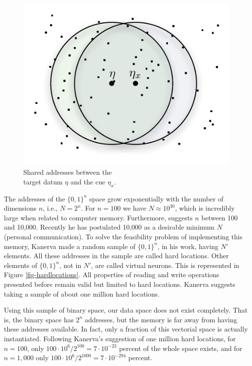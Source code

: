 \begin{figure}[!htb]
\centering\includegraphics[scale=0.75]{./images02/p1_inter_p2.pdf}

\caption{Shared addresses between the \protect \\
target datum $\eta$ and the cue $\eta_{x}$. \label{fig-shared-addresses}}
\end{figure}


The addresses of the $\{0,1\}^{n}$ space grow exponentially with the number of dimensions $n$, i.e., $N=2^{n}$. For $n=100$ we have $N\approx10^{30}$, which is incredibly large when related to computer memory. Furthermore, \citet{Kanerva1988} suggests $n$ between 100 and 10,000. Recently he has postulated 10,000 as a desirable minimum $N$ (personal communication). To solve the feasibility problem of implementing this memory, Kanerva made a random sample of $\{0,1\}^{n}$, in his work, having $N'$ elements. All these addresses in the sample are called hard locations. Other elements of $\{0,1\}^{n}$, not in $N'$, are called virtual neurons. This is represented in Figure \ref{fig-hardlocations}.  All properties of reading and write operations presented before remain valid but limited to hard locations. Kanerva suggests taking a sample of about one million hard locations.

Using this sample of binary space, our data space does not exist completely.  That is, the binary space has $2^{n}$ addresses, but the memory is far away from having these addresses available. In fact, only a fraction of this vectorial space is actually instantiated. Following Kanerva's suggestion of one million hard locations, for $n=100$, only $100\cdot10^{6}/2^{100}=7\cdot10^{-23}$ percent of the whole space exists, and for $n=1,000$ only $100\cdot10^{6}/2^{1000}=7\cdot10^{-294}$ percent.

